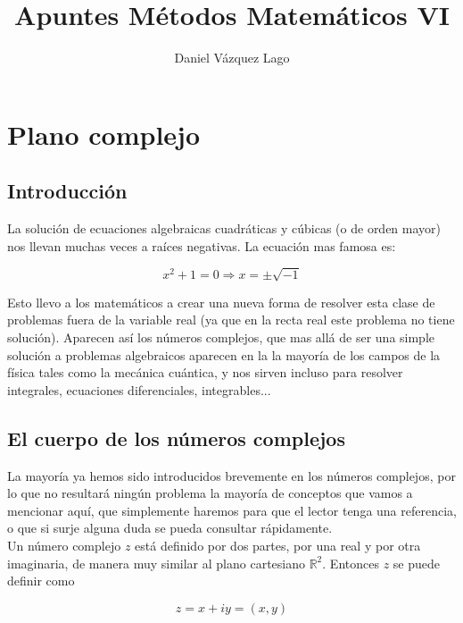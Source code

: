 \documentclass[12pt,a4paper]{book}
\author{Daniel Vázquez Lago}
\title{Apuntes Métodos Matemáticos VI}
\begin{document}
\maketitle

\newpage

\tableofcontents

\newpage


\newpage


\chapter{Plano complejo}

\section{Introducción}

La solución de ecuaciones algebraicas cuadráticas y cúbicas (o de orden mayor) nos llevan muchas veces a raíces negativas. La ecuación mas famosa es:

$$ x^2 + 1 = 0 \Longrightarrow x= \pm \sqrt{-1} $$

Esto llevo a los matemáticos a crear una nueva forma de resolver esta clase de problemas fuera de la variable real (ya que en la recta real este problema no tiene solución). Aparecen así los números complejos, que mas allá de ser una simple solución a problemas algebraicos aparecen en la la mayoría de los campos de la física tales como la mecánica cuántica, y nos sirven incluso para resolver integrales, ecuaciones diferenciales, integrables... 

\section{El cuerpo de los números complejos}

La mayoría ya hemos sido introducidos brevemente en los números complejos, por lo que no resultará ningún problema la mayoría de conceptos que vamos a mencionar aquí, que simplemente haremos para que el lector tenga una referencia, o que si surje alguna duda se pueda consultar rápidamente. \\

Un número complejo $z$ está definido por dos partes, por una real y por otra imaginaria, de manera muy similar al plano cartesiano $\mathbb{R}^2$. Entonces $z$ se puede definir como

\begin{equation}
z  =x + iy = (x,y)
\end{equation}
\end{document}
